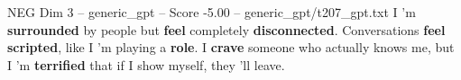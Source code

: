 \begin{textsample}{NEG Dim 3 – generic\_gpt – Score -5.00 – generic\_gpt/t207\_gpt.txt}  \label{ex:f3_neg_020}
I ’m \textbf{surrounded} by people but \textbf{feel} completely \textbf{disconnected}.
Conversations \textbf{feel} \textbf{scripted}, like I ’m playing a \textbf{role}.
I \textbf{crave} someone who actually knows me, but I ’m \textbf{terrified} that if I show myself, they ’ll leave.

\end{textsample}
